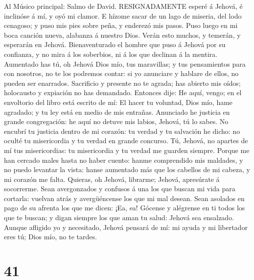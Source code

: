  Al Músico principal: Salmo de David. RESIGNADAMENTE esperé
á Jehová, é inclinóse á mí, y oyó mi clamor.  E hízome sacar
de un lago de miseria, del lodo cenagoso; y puso mis pies sobre peña, y
enderezó mis pasos.  Puso luego en mi boca canción nueva,
alabanza á nuestro Dios. Verán esto muchos, y temerán, y esperarán en
Jehová.  Bienaventurado el hombre que puso á Jehová por su
confianza, y no mira á los soberbios, ni á los que declinan á la
mentira.  Aumentado has tú, oh Jehová Dios mío, tus
maravillas; y tus pensamientos para con nosotros, no te los podremos
contar: si yo anunciare y hablare de ellos, no pueden ser enarrados.
 Sacrificio y presente no te agrada; has abierto mis oídos;
holocausto y expiación no has demandado.  Entonces dije: He
aquí, vengo; en el envoltorio del libro está escrito de mí: 
El hacer tu voluntad, Dios mío, hame agradado; y tu ley está en medio de
mis entrañas.  Anunciado he justicia en grande congregación:
he aquí no detuve mis labios, Jehová, tú lo sabes.  No
encubrí tu justicia dentro de mi corazón: tu verdad y tu salvación he
dicho: no oculté tu misericordia y tu verdad en grande concurso.
 Tú, Jehová, no apartes de mí tus misericordias: tu
misericordia y tu verdad me guarden siempre.  Porque me han
cercado males hasta no haber cuento: hanme comprendido mis maldades, y
no puedo levantar la vista: hanse aumentado más que los cabellos de mi
cabeza, y mi corazón me falta.  Quieras, oh Jehová,
librarme; Jehová, apresúrate á socorrerme.  Sean
avergonzados y confusos á una los que buscan mi vida para cortarla:
vuelvan atrás y avergüéncense los que mi mal desean.  Sean
asolados en pago de su afrenta los que me dicen: ¡Ea, ea! 
Gócense y alégrense en ti todos los que te buscan; y digan siempre los
que aman tu salud: Jehová sea ensalzado.  Aunque afligido
yo y necesitado, Jehová pensará de mí: mi ayuda y mi libertador eres tú;
Dios mío, no te tardes.

\hypertarget{section-40}{%
\section{41}\label{section-40}}

